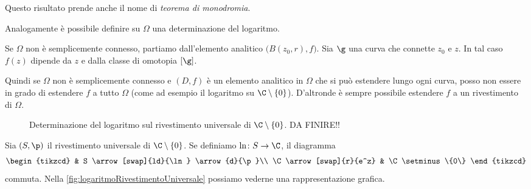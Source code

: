 \begin{notz}
	Questo risultato prende anche il nome di \emph{teorema di monodromia}.
\end{notz}

\begin{oss}
	Analogamente è possibile definire su \(\Omega\) una determinazione del logaritmo.
\end{oss}

\begin{oss}
	Se \(\Omega\) non è semplicemente connesso, partiamo dall'elemento analitico \(\big(B(z_0,r),f\big)\). Sia \(\g\) una curva che connette \(z_0\) e \(z\).
	In tal caso \(f(z)\) dipende da \(z\) e dalla classe di omotopia \([\g]\).
	
	Quindi se \(\Omega\) non è semplicemente connesso e \((D,f)\) è un elemento analitico in \(\Omega\) che si può estendere lungo ogni curva, posso non essere in grado di estendere \(f\) a tutto \(\Omega\) (come ad esempio il logaritmo su \(\C\setminus\{0\}\)).
	D'altronde è sempre possibile estendere \(f\) a un rivestimento di \(\Omega\).
\end{oss}

\begin{figure}[tp]
	\centering
	\caption{Determinazione del logaritmo sul rivestimento universale di \(\C\setminus\{0\}\). DA FINIRE!!}
	\label{fig:logaritmoRivestimentoUniversale}
\end{figure}

\begin{ese}[Logaritmo]
	Sia \((S,\p)\) il rivestimento universale di \(\C\setminus\{0\}\). Se definiamo \(\ln\colon S \to \C\), il diagramma
	\[
		\begin{tikzcd}
			& S \arrow[swap]{ld}{\ln} \arrow{d}{\p}\\
			\C \arrow[swap]{r}{e^z} & \C\setminus\{0\}
		\end{tikzcd}
	\]
	commuta.
	Nella \autoref{fig:logaritmoRivestimentoUniversale} possiamo vederne una rappresentazione grafica.
\end{ese}